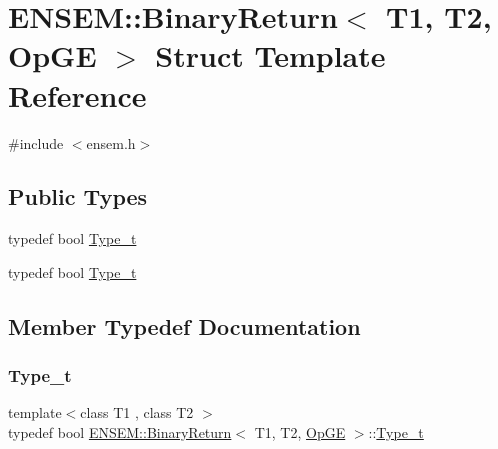 \hypertarget{structENSEM_1_1BinaryReturn_3_01T1_00_01T2_00_01OpGE_01_4}{}\section{E\+N\+S\+EM\+:\+:Binary\+Return$<$ T1, T2, Op\+GE $>$ Struct Template Reference}
\label{structENSEM_1_1BinaryReturn_3_01T1_00_01T2_00_01OpGE_01_4}


{\ttfamily \#include $<$ensem.\+h$>$}

\subsection*{Public Types}
\begin{DoxyCompactItemize}
\item 
typedef bool \mbox{\hyperlink{structENSEM_1_1BinaryReturn_3_01T1_00_01T2_00_01OpGE_01_4_a8b2ef4a5b38d3f7cb5dc26a1fb4bdb89}{Type\+\_\+t}}
\item 
typedef bool \mbox{\hyperlink{structENSEM_1_1BinaryReturn_3_01T1_00_01T2_00_01OpGE_01_4_a8b2ef4a5b38d3f7cb5dc26a1fb4bdb89}{Type\+\_\+t}}
\end{DoxyCompactItemize}


\subsection{Member Typedef Documentation}
\mbox{\label{structENSEM_1_1BinaryReturn_3_01T1_00_01T2_00_01OpGE_01_4_a8b2ef4a5b38d3f7cb5dc26a1fb4bdb89}} 
\subsubsection{\texorpdfstring{Type\_t}{Type\_t}\hspace{0.1cm}{\footnotesize\ttfamily [1/2]}}
{\footnotesize\ttfamily template$<$class T1 , class T2 $>$ \\
typedef bool \mbox{\hyperlink{structENSEM_1_1BinaryReturn}{E\+N\+S\+E\+M\+::\+Binary\+Return}}$<$ T1, T2, \mbox{\hyperlink{structENSEM_1_1OpGE}{Op\+GE}} $>$\+::\mbox{\hyperlink{structENSEM_1_1BinaryReturn_3_01T1_00_01T2_00_01OpGE_01_4_a8b2ef4a5b38d3f7cb5dc26a1fb4bdb89}{Type\+\_\+t}}}

